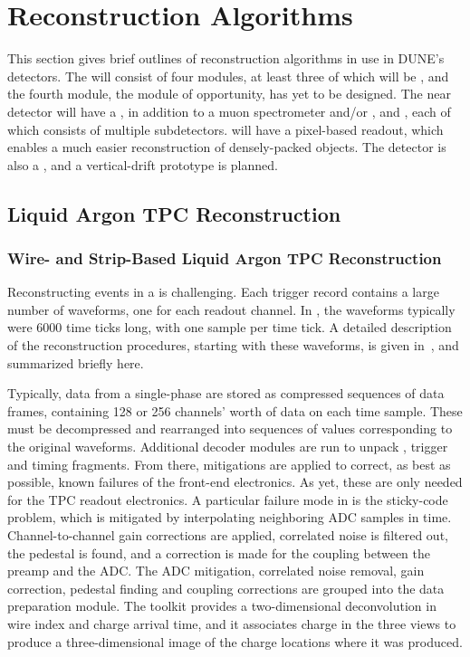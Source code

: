 \documentclass[../main-v1.tex]{subfiles}
\begin{document}
\section{Reconstruction Algorithms}
\label{sec:algo:reco}

This section gives brief outlines of reconstruction algorithms in use in DUNE's detectors.  The  will consist of four modules, at least three of which will be , and the fourth module, the module of opportunity, has yet to be designed.  The near detector will have a , in addition to a muon spectrometer and/or , and , each of which consists of multiple subdetectors.   will have a pixel-based readout, which enables a much easier reconstruction of densely-packed objects.  The  detector is also a , and a vertical-drift prototype is planned.

\subsection{Liquid Argon TPC Reconstruction}
\label{sec:algo:reco:lartpc}

\subsubsection{Wire- and Strip-Based Liquid Argon TPC Reconstruction}
\label{sec:algo:reco:lartpc:wirestrip}

Reconstructing events in a  is challenging.  Each trigger record contains a large number of waveforms, one for each readout channel.  In , the waveforms typically were 6000 time ticks long, with one  sample per time tick.  A detailed description of the reconstruction procedures, starting with these waveforms, is given in~\cite{Abi:2020mwi}, and summarized briefly here.

Typically, data from a single-phase   are stored as compressed sequences of data frames, containing 128 or 256 channels' worth of data on each time sample.  These must be decompressed and rearranged into sequences of  values corresponding to the original waveforms.  Additional decoder modules are run to unpack ,  trigger and timing  fragments.
From there, mitigations are applied to correct, as best as possible, known failures of the front-end electronics.  As yet, these are only needed for the TPC readout electronics.  A particular failure mode in  is the sticky-code problem, which is mitigated by interpolating neighboring ADC samples in time.  Channel-to-channel gain corrections are applied, correlated noise is filtered out, the pedestal is found, and a correction is made for the  coupling between the preamp and the ADC.  The ADC mitigation, correlated noise removal, gain correction, pedestal finding and  coupling corrections are grouped into the data preparation module.  The  toolkit provides a two-dimensional deconvolution in wire index and charge arrival time, and it associates charge in the three views to produce a three-dimensional image of the charge locations where it was produced.  
\end{document}
